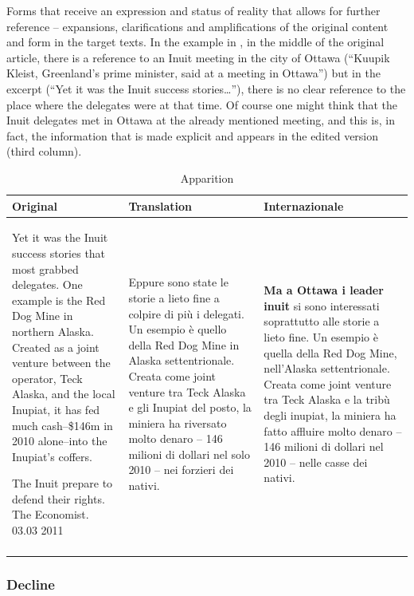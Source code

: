 \documentclass[output=paper]{LSP/langsci}
\begin{document}
Forms that receive an expression and status of reality that allows for further reference -- expansions, clarifications and amplifications of the original content and form in the target texts. In the example in , in the middle of the original article, there is a reference to an Inuit meeting in the city of Ottawa (``Kuupik Kleist, Greenland's prime minister, said at a meeting in Ottawa'') but in the excerpt (``Yet it was the Inuit success stories\ldots ''), there is no clear reference to the place where the delegates were at that time. Of course one might think that the Inuit delegates met in Ottawa at the already mentioned meeting, and this is, in fact, the information that is made explicit and appears in the edited version (third column). 

%
\begin{table}
 \tiny
 \caption{Apparition}
 \label{troqe-marchan:tab:4}
\begin{tabularx}{\textwidth}{XXX}
\lsptoprule
  Original &  Translation &  Internazionale\\
  \midrule
Yet it was the Inuit success stories that most grabbed delegates. One example is the Red Dog Mine in northern Alaska. Created as a joint venture between the operator, Teck Alaska, and the local Inupiat, it has fed much cash--\$146m in 2010 alone--into the Inupiat's coffers.

 The Inuit prepare to defend their rights. The Economist. 03.03 2011 & Eppure sono state le storie a lieto fine a colpire di più i delegati. Un esempio è quello della Red Dog Mine in Alaska settentrionale. Creata come joint venture tra Teck Alaska e gli Inupiat del posto, la miniera ha riversato molto denaro -- 146 milioni di dollari nel solo 2010 -- nei forzieri dei nativi. &  \textbf{Ma a Ottawa i leader inuit} si sono interessati soprattutto alle storie a lieto fine. Un esempio è quella della Red Dog Mine, nell'Alaska settentrionale. Creata come joint venture tra Teck Alaska e la tribù degli inupiat, la miniera ha fatto affluire molto denaro -- 146 milioni di dollari nel 2010 -- nelle casse dei nativi. \\
\lspbottomrule
\end{tabularx}
\end{table}

\subsubsection{Decline}
\end{document}
